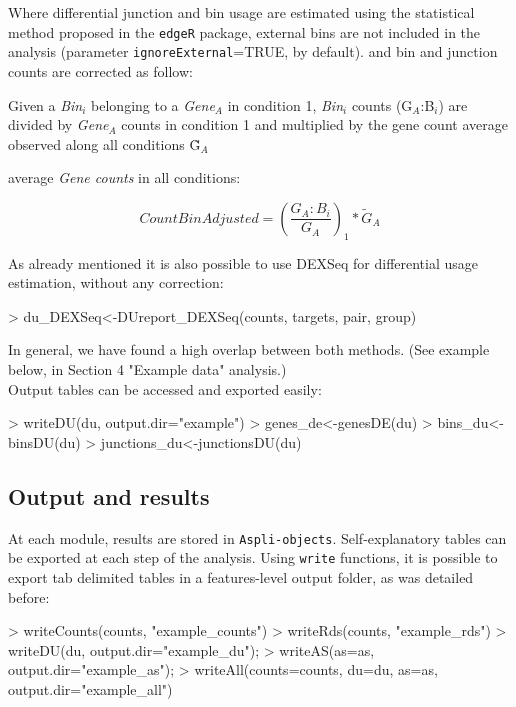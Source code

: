 \documentclass{article}
\begin{document}
Where differential junction and bin usage are estimated using the statistical method proposed in the \texttt{edgeR} package, external bins are not included in the analysis (parameter \texttt{ignoreExternal}=TRUE, by default). 
and bin and junction counts are corrected as follow:

Given a \textit{Bin$_i$} belonging to a \textit{Gene$_A$} in condition 1, \textit{Bin$_i$} counts ({G$_A$:B$_i$}) are divided by \textit{Gene$_A$} counts in condition 1 and multiplied by the gene count  average observed along all conditions \~G$_A$

average \textit{Gene counts} in all conditions:

	\[ CountBinAdjusted=(\frac{G_A:B_i}{G_A})_1 * \tilde G_A \]

As already mentioned it is also possible to use DEXSeq for differential usage estimation, without any correction:
\begin{Schunk}
\begin{Sinput}
>  du_DEXSeq<-DUreport_DEXSeq(counts, targets, pair, group)
\end{Sinput}
\end{Schunk}

In general, we have found a high overlap between both methods. (See example below, in Section 4 "Example data" analysis.)\\

Output tables can be accessed and exported easily:
 
\begin{Schunk}
\begin{Sinput}
> writeDU(du, output.dir="example")
> genes_de<-genesDE(du)
> bins_du<-binsDU(du)
> junctions_du<-junctionsDU(du)
\end{Sinput}
\end{Schunk}

\subsection{Output and results}
At each module, results are stored in \texttt{Aspli-objects}. Self-explanatory tables can be exported at each step of the analysis. Using \texttt{write} functions, it is possible to export tab delimited tables in a features-level output folder, as was detailed before:

\begin{Schunk}
\begin{Sinput}
> writeCounts(counts, "example_counts")
> writeRds(counts, "example_rds")
> writeDU(du, output.dir="example_du");
> writeAS(as=as, output.dir="example_as");
> writeAll(counts=counts, du=du, as=as, output.dir="example_all")
\end{Sinput}
\end{Schunk}
\end{document}
